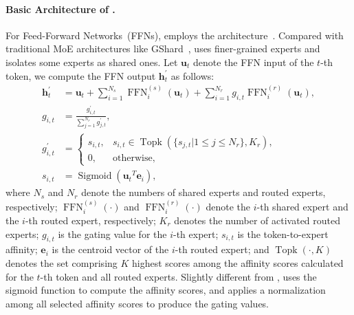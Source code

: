 \paragraph{Basic Architecture of \dsmoe{}.}
For Feed-Forward Networks~(FFNs), \dsviii{} employs the \dsmoe{} architecture~\citep{deepseekmoe}. 
Compared with traditional MoE architectures like GShard~\citep{gshard}, \dsmoe{} uses finer-grained experts and isolates some experts as shared ones.
Let $\mathbf{u}_{t}$ denote the FFN input of the $t$-th token, we compute the FFN output $\mathbf{h}_{t}^{\prime}$ as follows:
\begin{align}
    \mathbf{h}_{t}^{\prime} & = \mathbf{u}_{t} + \sum_{i=1}^{N_{s}} {\operatorname{FFN}^{(s)}_{i}\left( \mathbf{u}_{t} \right)} + \sum_{i=1}^{N_r} {g_{i,t} \operatorname{FFN}^{(r)}_{i}\left( \mathbf{u}_{t} \right)}, \\
    g_{i,t} & = \frac{g^{\prime}_{i,t}}{\sum_{j=1}^{N_r} g^{\prime}_{j,t}}, \\
    g^{\prime}_{i,t} & = \begin{cases} 
    s_{i,t}, & s_{i,t} \in \operatorname{Topk} (\{ s_{j, t} | 1 \leq j \leq N_r \}, K_{r}), \\
    0, & \text{otherwise}, 
    \end{cases} \\
    s_{i,t} & = \operatorname{Sigmoid} \left( {\mathbf{u}_{t}}^{T} \mathbf{e}_{i} \right),
\end{align}
where $N_{s}$ and $N_r$ denote the numbers of shared experts and routed experts, respectively; 
$\operatorname{FFN}^{(s)}_{i}(\cdot)$ and $\operatorname{FFN}^{(r)}_{i}(\cdot)$ denote the $i$-th shared expert and the $i$-th routed expert, respectively; 
$K_{r}$ denotes the number of activated routed experts; 
$g_{i,t}$ is the gating value for the $i$-th expert; 
$s_{i,t}$ is the token-to-expert affinity; 
$\mathbf{e}_{i}$ is the centroid vector of the $i$-th routed expert; 
and $\operatorname{Topk}(\cdot, K)$ denotes the set comprising $K$ highest scores among the affinity scores calculated for the $t$-th token and all routed experts.
Slightly different from \dsvii{}, \dsviii{} uses the sigmoid function to compute the affinity scores, and applies a normalization among all selected affinity scores to produce the gating values. 

